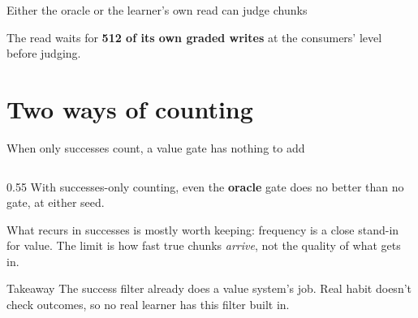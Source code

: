 \documentclass[aspectratio=169,11pt]{beamer}
\newcommand{\warmtext}[1]{\textcolor{gateorange}{\textbf{#1}}}
\newcommand{\oracletext}[1]{\textcolor{armoracle}{\textbf{#1}}}
\begin{document}
\begin{frame}{Either the oracle or the learner's own read can judge chunks}
\medskip
\begin{center}
{\small The read waits for \warmtext{512 of its own graded writes} at the consumers' level before judging.}
\end{center}
\end{frame}

\section{Two ways of counting}

\begin{frame}{When only successes count, a value gate has nothing to add}
\begin{columns}[T]
\begin{column}{0.55\textwidth}
{\small With successes-only counting, even the \oracletext{oracle} gate does no better than no gate, at either seed.}

\smallskip
{\small What recurs in successes is mostly worth keeping: frequency is a close stand-in for value. The limit is how fast true chunks \emph{arrive}, not the quality of what gets in.}

\smallskip
\begin{alertblock}{Takeaway}
{\small The success filter already does a value system's job. Real habit doesn't check outcomes, so no real learner has this filter built in.}
\end{alertblock}
\end{column}


\end{columns}
\end{frame}
\end{document}
